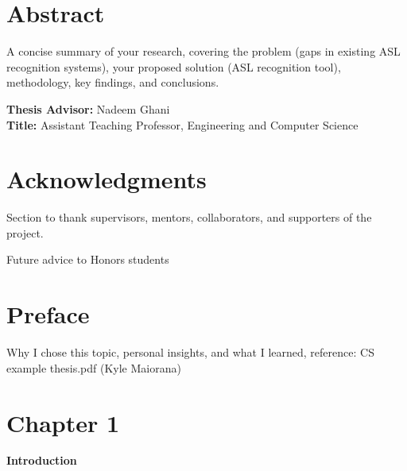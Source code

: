 \documentclass[12pt]{article}
\begin{document}
\clearpage
\section*{Abstract}
\vspace{1em}

\noindent
A concise summary of your research, covering the problem (gaps in existing ASL recognition 
systems), your proposed solution (ASL recognition tool), methodology, key findings, and
conclusions. 

\vspace{2em}
\noindent
\textbf{Thesis Advisor:} Nadeem Ghani \\
\textbf{Title:} Assistant Teaching Professor, Engineering and Computer Science

\newpage
\mbox{}                
\newpage

\newpage
\doublespacing
\section*{Acknowledgments}

Section to thank supervisors, mentors, collaborators, and supporters of the project.

Future advice to Honors students


\newpage
\doublespacing
\section*{Preface}

Why I chose this topic, personal insights, and what I learned, reference: CS example 
thesis.pdf (Kyle Maiorana)

\clearpage
{}
\setcounter{page}{1}
\doublespacing

\newpage
\tableofcontents
\newpage

\doublespacing

\newpage
\section*{Chapter 1}
\begin{center}
\large \textbf{Introduction}
\end{center}
\end{document}
